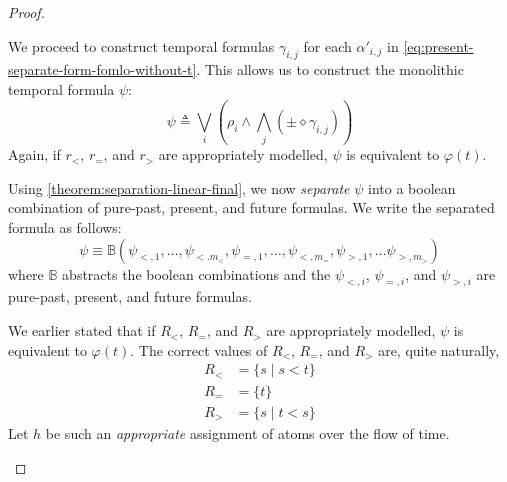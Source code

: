 \documentclass[a4paper,UKenglish,cleveref, autoref, thm-restate, numberwithinsect]{lipics-v2021}
\begin{document}
\begin{proof}
\begin{description}
        We proceed to construct temporal formulas $\gamma_{i, j}$ for each $\alpha'_{i, j}$ in \cref{eq:present-separate-form-fomlo-without-t}. This allows us to construct the monolithic temporal formula $\psi$:
        \begin{equation*}
            \psi \triangleq \bigvee_i \left( \rho_i \land \bigwedge_j \left( \pm \diamond \gamma_{i, j} \right) \right)
        \end{equation*}
        Again, if $r_<$, $r_=$, and $r_>$ are appropriately modelled, $\psi$ is equivalent to $\varphi(t)$.

        Using \cref{theorem:separation-linear-final}, we now \textit{separate} $\psi$ into a boolean combination of pure-past, present, and future formulas. We write the separated formula as follows:
        \begin{equation*}
            \psi \equiv \mathbb{B}(\psi_{<, 1}, \ldots, \psi_{<. m_<}, \psi_{=, 1}, \ldots, \psi_{<, m_=}, \psi_{>, 1}, \ldots \psi_{>, m_>})
        \end{equation*}
        where $\mathbb{B}$ abstracts the boolean combinations and the $\psi_{<, i}$, $\psi_{=, i}$, and $\psi_{>, i}$ are pure-past, present, and future formulas.

        We earlier stated that if $R_<$, $R_=$, and $R_>$ are appropriately modelled, $\psi$ is equivalent to $\varphi(t)$. The correct values of $R_<$, $R_=$, and $R_>$ are, quite naturally,
        \begin{equation*}
            \begin{aligned}
                R_< &= \{s \mid s < t\}\\
                R_= &= \{t\}\\
                R_> &= \{s \mid t < s\}
            \end{aligned}
        \end{equation*}
        Let $h$ be such an \textit{appropriate} assignment of atoms over the flow of time.


\end{description}
\end{proof}
\end{document}
